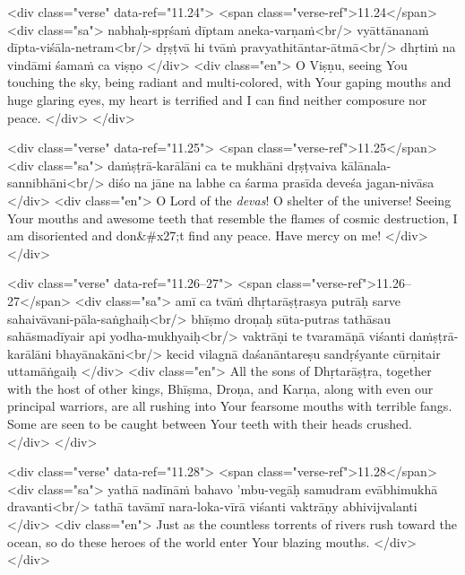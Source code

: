 \begin{html}
<div class="verse" data-ref="11.24">
  <span class="verse-ref">11.24</span>
  <div class="sa">
    nabhaḥ-spṛśaṁ dīptam aneka-varṇaṁ<br/>
    vyāttānanaṁ dīpta-viśāla-netram<br/>
    dṛṣṭvā hi tvāṁ pravyathitāntar-ātmā<br/>
    dhṛtiṁ na vindāmi śamaṁ ca viṣṇo
  </div>
  <div class="en">
    O Viṣṇu, seeing You touching the sky, being radiant and multi-colored, with Your gaping mouths and huge glaring eyes, my heart is terrified and I can find neither composure nor peace.
  </div>
</div>
\end{html}



\begin{html}
<div class="verse" data-ref="11.25">
  <span class="verse-ref">11.25</span>
  <div class="sa">
    daṁṣṭrā-karālāni ca te mukhāni dṛṣṭvaiva kālānala-sannibhāni<br/>
    diśo na jāne na labhe ca śarma prasīda deveśa jagan-nivāsa
  </div>
  <div class="en">
    O Lord of the \textit{devas}! O shelter of the universe! Seeing Your mouths and awesome teeth that resemble the flames of cosmic destruction, I am disoriented and don&#x27;t find any peace. Have mercy on me!
  </div>
</div>
\end{html}



\begin{html}
<div class="verse" data-ref="11.26–27">
  <span class="verse-ref">11.26–27</span>
  <div class="sa">
    amī ca tvāṁ dhṛtarāṣṭrasya putrāḥ sarve sahaivāvani-pāla-saṅghaiḥ<br/>
    bhīṣmo droṇaḥ sūta-putras tathāsau sahāsmadīyair api yodha-mukhyaiḥ<br/>
    vaktrāṇi te tvaramāṇā viśanti daṁṣṭrā-karālāni bhayānakāni<br/>
    kecid vilagnā daśanāntareṣu sandṛśyante cūrṇitair uttamāṅgaiḥ
  </div>
  <div class="en">
    All the sons of Dhṛtarāṣṭra, together with the host of other kings, Bhīṣma, Droṇa, and Karṇa, along with even our principal warriors, are all rushing into Your fearsome mouths with terrible fangs. Some are seen to be caught between Your teeth with their heads crushed.
  </div>
</div>
\end{html}



\begin{html}
<div class="verse" data-ref="11.28">
  <span class="verse-ref">11.28</span>
  <div class="sa">
    yathā nadīnāṁ bahavo ’mbu-vegāḥ samudram evābhimukhā dravanti<br/>
    tathā tavāmī nara-loka-vīrā viśanti vaktrāṇy abhivijvalanti
  </div>
  <div class="en">
    Just as the countless torrents of rivers rush toward the ocean, so do these heroes of the world enter Your blazing mouths.
  </div>
</div>
\end{html}



